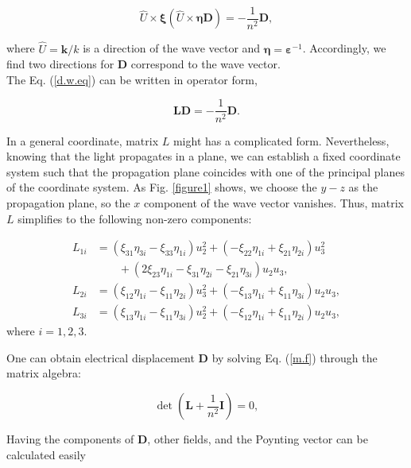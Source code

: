 \documentclass[9pt,twocolumn,twoside]{osajnl}
\begin{document}
\begin{equation}\label{d.w.eq}
    \hat{U}\times{\boldsymbol{\xi}(\hat{U}\times\boldsymbol{\eta}\mathbf{D})}=-\frac{1}{n^{2}}\mathbf{D},
\end{equation}

where $\hat{U}=\mathbf{k}/k$ is a direction of the wave vector and $\boldsymbol{\eta}=\boldsymbol{\varepsilon}^{-1}$. Accordingly, we find  two directions for $\mathbf{D}$ correspond to  the wave vector.\\

 The Eq. (\ref{d.w.eq}) can be written in operator form,

\begin{equation}\label{m.f}
\mathbf{L}\mathbf{D}=-\frac{1}{n^{2}}\mathbf{D}.        
\end{equation}

In a general coordinate, matrix  $L$ might has a complicated form. Nevertheless, knowing that the light propagates in a plane, we can establish a fixed coordinate system such that the propagation plane coincides with one of the principal planes of the coordinate system. As  Fig. \ref{figure1} shows, we choose the $y-z$ as the propagation plane, so the $x$ component of  the wave vector vanishes.  Thus,  matrix $L$ simplifies to the following non-zero components:

\begin{align}
L_{1i} &= (\xi_{31}\eta_{3i}-\xi_{33}\eta_{1i})u^{2}_{2} +(-\xi_{22}\eta_{1i}+\xi_{21}\eta_{2i})u^{2}_{3}\nonumber\\
&\qquad +(2\xi_{23}\eta_{1i}-\xi_{31}\eta_{2i}-\xi_{21}\eta_{3i})u_{2}u_{3},\nonumber\\
L_{2i} &=(\xi_{12}\eta_{1i}-\xi_{11}\eta_{2i})u^{2}_{3}+(-\xi_{13}\eta_{1i}+\xi_{11}\eta_{3i})u_{2}u_{3}, \nonumber \\
L_{3i} &=(\xi_{13}\eta_{1i}-\xi_{11}\eta_{3i})u^{2}_{2}+(-\xi_{12}\eta_{1i}+\xi_{11}\eta_{2i})u_{2}u_{3},
 \end{align}
where $i=1,2,3$.

One can obtain electrical displacement $\mathbf{D}$  by solving  Eq. (\ref{m.f}) through the matrix algebra:


\begin{equation}\label{det}
    \det(\mathbf{L}+\frac{1}{n^{2}}\mathbf{I})=0,
\end{equation}

Having the components of  $\mathbf{D}$, other fields, and the Poynting vector can be calculated easily  \cite{jackson1962classical}
\end{document}
